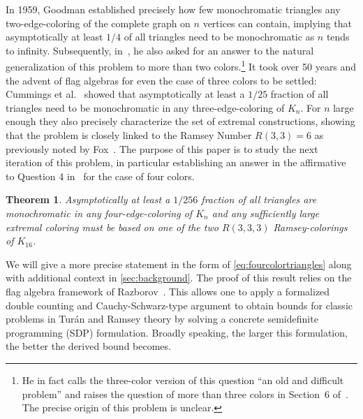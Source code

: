 \documentclass[a4paper,11pt]{article}
\newtheorem{theorem}{Theorem}[section]
\numberwithin{equation}{section}
\begin{document}
In 1959, Goodman \cite{Goodman_1959} established precisely how few monochromatic triangles any two-edge-coloring of the complete graph on $n$ vertices can contain, implying that asymptotically at least $1/4$ of all triangles need to be monochromatic as $n$ tends to infinity. Subsequently, in~\cite{Goodman_1985}, he also asked for an answer to the natural generalization of this problem to more than two colors.\footnote{He in fact calls the three-color version of this question ``an old and difficult problem'' and raises the question of more than three colors in Section~6 of~\cite{Goodman_1985}. The precise origin of this problem is unclear.} It took over 50 years and the advent of flag algebras for even the case of three colors to be settled: Cummings et al.~\cite{CummingsEtAl_2013} showed that asymptotically at least a $1/25$ fraction of all triangles need to be monochromatic in any three-edge-coloring of $K_n$. For $n$ large enough they also precisely characterize the set of extremal constructions, showing that the problem is closely linked to the Ramsey Number $R(3,3) = 6$ as previously noted by Fox~\cite[Theorem  5.2]{fox2008there}. The purpose of this paper is to study the next iteration of this problem, in particular establishing an answer in the affirmative to Question 4 in~\cite{CummingsEtAl_2013} for the case of four colors.
%
\begin{theorem}\label{thm:fourcolortriangles}
    Asymptotically at least a $1/256$ fraction of all triangles are monochromatic in any four-edge-coloring of $K_n$ and any sufficiently large extremal coloring must be based on one of the two $R(3,3,3)$ Ramsey-colorings of $K_{16}$.
\end{theorem}
%
We will give a more precise statement in the form of \cref{eq:fourcolortriangles} along with additional context in \cref{sec:background}. The proof of this result relies on the flag algebra framework of Razborov~\cite{Razborov_2007, CoreglianoRazborov_2020}. This allows one to apply a formalized double counting and Cauchy-Schwarz-type argument to obtain bounds for classic problems in Tur\'an and Ramsey theory by solving a concrete semidefinite programming (SDP) formulation. Broadly speaking, the larger this formulation, the better the derived bound becomes.
\end{document}
